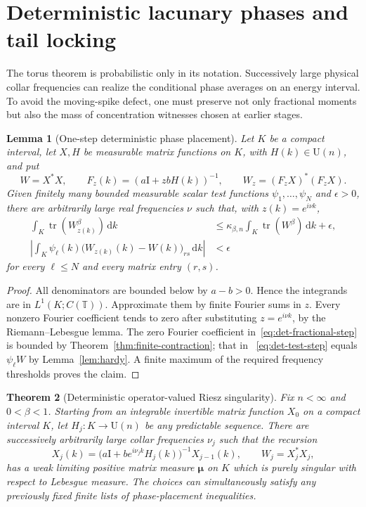 \documentclass[11pt]{article}
\newtheorem{theorem}{Theorem}[section]
\newtheorem{lemma}[theorem]{Lemma}
\theoremstyle{remark}
\newcommand{\T}{\mathbb T}
\newcommand{\Id}{\mathrm I}
\newcommand{\dd}{\,\mathrm d}
\newcommand{\tr}{\operatorname{tr}}
\newcommand{\U}{\mathrm U}
\begin{document}
\section{Deterministic lacunary phases and tail locking}

The torus theorem is probabilistic only in its notation.  Successively large
physical collar frequencies can realize the conditional phase averages on an
energy interval.  To avoid the moving-spike defect, one must preserve not
only fractional moments but also the mass of concentration witnesses chosen
at earlier stages.

\begin{lemma}[One-step deterministic phase placement]
\label{lem:one-step-placement}
Let $K$ be a compact interval, let $X,H$ be measurable matrix functions on
$K$, with $H(k)\in\U(n)$, and put
\[
 W=X^*X,\qquad
 F_z(k)=(a\Id+zbH(k))^{-1},\qquad
 W_z=(F_zX)^*(F_zX).
\]
Given finitely many bounded measurable scalar test functions
$\psi_1,\ldots,\psi_N$ and $\epsilon>0$, there are arbitrarily large real
frequencies $\nu$ such that, with $z(k)=e^{i\nu k}$,
\begin{align}
 \int_K\tr(W_{z(k)}^\beta)\dd k
 &\leq\kappa_{\beta,n}\int_K\tr(W^\beta)\dd k+\epsilon,
 \label{eq:det-fractional-step}\\
 \left|\int_K\psi_\ell(k)
   \bigl(W_{z(k)}(k)-W(k)\bigr)_{rs}\dd k\right|
 &<\epsilon
 \label{eq:det-test-step}
\end{align}
for every $\ell\leq N$ and every matrix entry $(r,s)$.
\end{lemma}

\begin{proof}
All denominators are bounded below by $a-b>0$.  Hence the integrands are in
$L^1(K;C(\T))$.  Approximate them by finite Fourier sums in $z$.  Every
nonzero Fourier coefficient tends to zero after substituting
$z=e^{i\nu k}$, by the Riemann--Lebesgue lemma.  The zero Fourier coefficient
in~\eqref{eq:det-fractional-step} is bounded by
Theorem~\ref{thm:finite-contraction}; that in
~\eqref{eq:det-test-step} equals $\psi_\ell W$ by
Lemma~\ref{lem:hardy}.  A finite maximum of the required frequency
thresholds proves the claim.
\end{proof}

\begin{theorem}[Deterministic operator-valued Riesz singularity]
\label{thm:deterministic-singularity}
Fix $n<\infty$ and $0<\beta<1$.  Starting from an integrable invertible
matrix function $X_0$ on a compact interval $K$, let
$H_j:K\to\U(n)$ be any predictable sequence.  There are successively
arbitrarily large collar frequencies $\nu_j$ such that the recursion
\begin{equation}
 X_j(k)=
 \bigl(a\Id+be^{i\nu_jk}H_j(k)\bigr)^{-1}X_{j-1}(k),
 \qquad W_j=X_j^*X_j,
 \label{eq:deterministic-recursion}
\end{equation}
has a weak limiting positive matrix measure
$\boldsymbol\mu$ on $K$ which is purely singular with respect to Lebesgue
measure.  The choices can simultaneously satisfy any previously fixed
finite lists of phase-placement inequalities.
\end{theorem}
\end{document}
